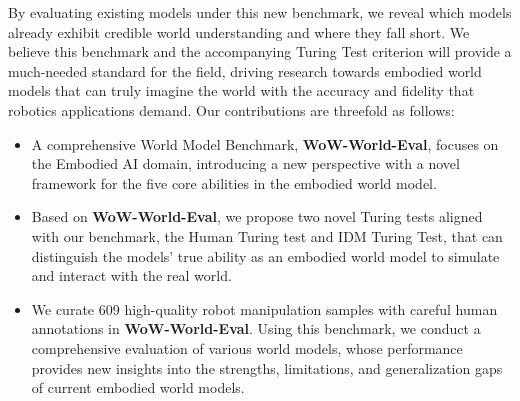 By evaluating existing models under this new benchmark, we reveal which models already exhibit credible world understanding and where they fall short. We believe this benchmark and the accompanying Turing Test criterion will provide a much-needed standard for the field, driving research towards embodied world models that can truly imagine the world with the accuracy and fidelity that robotics applications demand. Our contributions are threefold as follows:
\begin{itemize}
    \item A comprehensive World Model Benchmark, \textbf{WoW-World-Eval}, focuses on the Embodied AI domain, introducing a new perspective with a novel framework for the five core abilities in the embodied world model. 
    
    \item Based on \textbf{WoW-World-Eval}, we propose two novel Turing tests aligned with our benchmark, the Human Turing test and IDM Turing Test, that can distinguish the models' true ability as an embodied world model to simulate and interact with the real world.

    \item We curate 609 high-quality robot manipulation samples with careful human annotations in \textbf{WoW-World-Eval}. Using this benchmark, we conduct a comprehensive evaluation of various world models, whose performance provides new insights into the strengths, limitations, and generalization gaps of current embodied world models.
\end{itemize}

